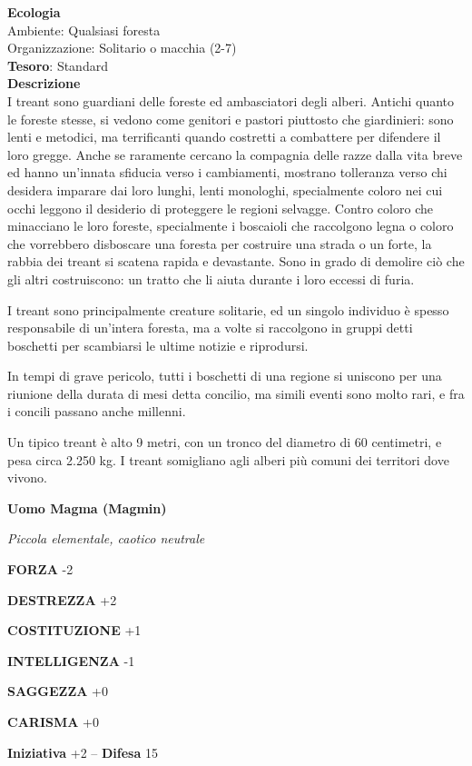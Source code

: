 \begin{multicols}{2}
	\textbf{Ecologia}\\
	Ambiente: Qualsiasi foresta\\
	Organizzazione: Solitario o macchia (2-7)\\
	\textbf{Tesoro}: Standard\\
	\textbf{Descrizione}\\
	I treant sono guardiani delle foreste ed ambasciatori degli alberi. Antichi quanto le foreste stesse, si vedono come genitori e pastori piuttosto che giardinieri: sono lenti e metodici, ma terrificanti quando costretti a combattere per difendere il loro gregge. Anche se raramente cercano la compagnia delle razze dalla vita breve ed hanno un'innata sfiducia verso i cambiamenti, mostrano tolleranza verso chi desidera imparare dai loro lunghi, lenti monologhi, specialmente coloro nei cui occhi leggono il desiderio di proteggere le regioni selvagge. Contro coloro che minacciano le loro foreste, specialmente i boscaioli che raccolgono legna o coloro che vorrebbero disboscare una foresta per costruire una strada o un forte, la rabbia dei treant si scatena rapida e devastante. Sono in grado di demolire ciò che gli altri costruiscono: un tratto che li aiuta durante i loro eccessi di furia.

	I treant sono principalmente creature solitarie, ed un singolo individuo è spesso responsabile di un'intera foresta, ma a volte si raccolgono in gruppi detti boschetti per scambiarsi le ultime notizie e riprodursi.

	In tempi di grave pericolo, tutti i boschetti di una regione si uniscono per una riunione della durata di mesi detta concilio, ma simili eventi sono molto rari, e fra i concili passano anche millenni.

	Un tipico treant è alto 9 metri, con un tronco del diametro di 60 centimetri, e pesa circa 2.250 kg. I treant somigliano agli alberi più comuni dei territori dove vivono.

	\medskip{}\textbf{Uomo Magma (Magmin)}

	\textit{Piccola elementale, caotico neutrale}

	\textbf{FORZA} -2

	\textbf{DESTREZZA} +2

	\textbf{COSTITUZIONE} +1

	\textbf{INTELLIGENZA} -1

	\textbf{SAGGEZZA} +0

	\textbf{CARISMA} +0

	\textbf{Iniziativa} +2 -- \textbf{Difesa} 15


\end{multicols}
